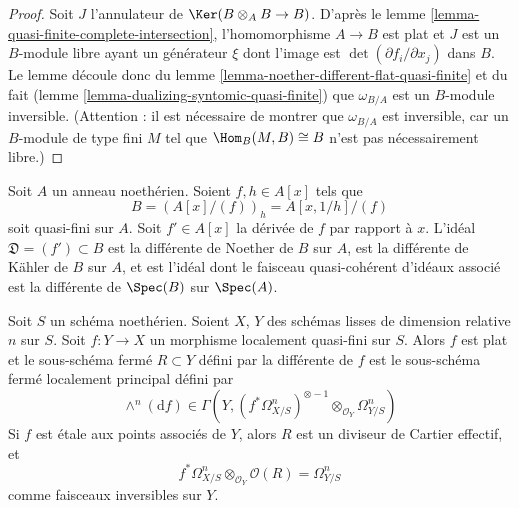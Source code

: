 \begin{proof}
Soit $J$ l'annulateur de $\Ker(B \otimes_A B \to B)$.
D'après le lemme \ref{lemma-quasi-finite-complete-intersection},
l'homomorphisme $A \to B$ est plat et
$J$ est un $B$-module libre ayant un générateur $\xi$ dont l'image est
$\det(\partial f_i/\partial x_j)$ dans $B$.
Le lemme découle donc du
lemme \ref{lemma-noether-different-flat-quasi-finite}
et du fait (lemme \ref{lemma-dualizing-syntomic-quasi-finite})
que $\omega_{B/A}$ est un $B$-module inversible.
(Attention : il est nécessaire de montrer que $\omega_{B/A}$
est inversible, car un $B$-module de type fini $M$ tel
que $\Hom_B(M, B) \cong B$ n'est pas nécessairement libre.)
\end{proof}

\begin{example}
\label{example-different-for-monogenic}
Soit $A$ un anneau noethérien. Soient $f, h \in A[x]$ tels que
$$
B = (A[x]/(f))_h = A[x, 1/h]/(f)
$$
soit quasi-fini sur $A$. Soit $f' \in A[x]$ la dérivée
de $f$ par rapport à $x$. L'idéal $\mathfrak{D} = (f') \subset B$
est la différente de Noether de $B$ sur $A$,
est la différente de Kähler de $B$ sur $A$, et
est l'idéal dont le faisceau quasi-cohérent d'idéaux associé est la
différente de $\Spec(B)$ sur $\Spec(A)$.
\end{example}

\begin{lemma}
\label{lemma-discriminant-quasi-finite-morphism-smooth}
Soit $S$ un schéma noethérien. Soient $X$, $Y$ des schémas lisses
de dimension relative $n$ sur $S$. Soit $f : Y \to X$ un
morphisme localement quasi-fini sur $S$.
Alors $f$ est plat et le sous-schéma fermé $R \subset Y$
défini par la différente de $f$ est le sous-schéma fermé localement principal
défini par
$$
\wedge^n(\text{d}f) \in
\Gamma(Y,
(f^*\Omega^n_{X/S})^{\otimes -1} \otimes_{\mathcal{O}_Y} \Omega^n_{Y/S})
$$
Si $f$ est étale aux points associés de $Y$, alors $R$ est un
diviseur de Cartier effectif, et
$$
f^*\Omega^n_{X/S} \otimes_{\mathcal{O}_Y} \mathcal{O}(R) =
\Omega^n_{Y/S}
$$
comme faisceaux inversibles sur $Y$.
\end{lemma}

